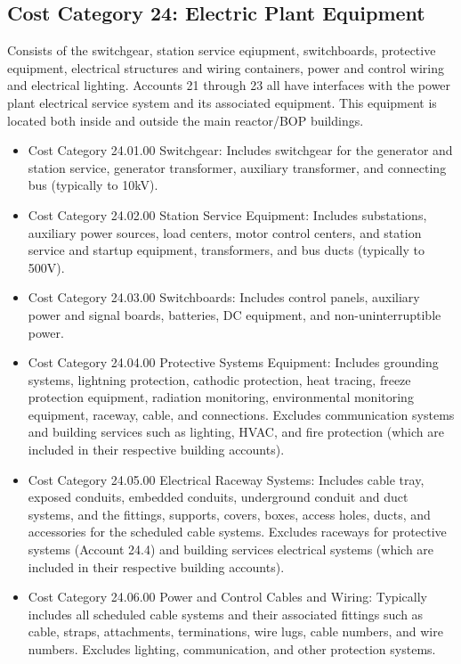 
\subsection{Cost Category 24: Electric Plant Equipment}

Consists of the switchgear, station service eqiupment, switchboards, protective equipment, electrical structures and wiring containers, power and control wiring and electrical lighting.  Accounts 21 through 23 all have interfaces with the power plant electrical service system and its associated equipment. This equipment is located both inside and outside the main reactor/BOP buildings.

\begin{itemize}

    \item Cost Category 24.01.00 Switchgear: Includes switchgear for the generator and station service, generator transformer, auxiliary transformer, and connecting bus (typically to 10kV).

    \item  Cost Category 24.02.00 Station Service Equipment: Includes substations, auxiliary power sources, load centers, motor control centers, and station service and startup equipment, transformers, and bus ducts (typically to 500V).

    \item  Cost Category 24.03.00 Switchboards: Includes control panels, auxiliary power and signal boards, batteries, DC equipment, and non-uninterruptible power.

    \item  Cost Category 24.04.00 Protective Systems Equipment: Includes grounding systems, lightning protection, cathodic protection, heat tracing, freeze protection equipment, radiation monitoring, environmental monitoring equipment, raceway, cable, and connections. Excludes communication systems and building services such as lighting, HVAC, and fire protection (which are included in their respective building accounts).

    \item  Cost Category 24.05.00 Electrical Raceway Systems: Includes cable tray, exposed conduits, embedded conduits, underground conduit and duct systems, and the fittings, supports, covers, boxes, access holes, ducts, and accessories for the scheduled cable systems. Excludes raceways for protective systems (Account 24.4) and building services electrical systems (which are included in their respective building
    accounts).

    \item  Cost Category 24.06.00 Power and Control Cables and Wiring: Typically includes all scheduled cable systems and their associated fittings such as cable, straps, attachments, terminations, wire lugs, cable numbers, and wire numbers. Excludes lighting, communication, and other protection systems.

\end{itemize}

